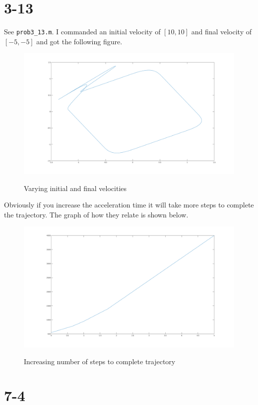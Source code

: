 \documentclass{../homework}
\begin{document}
\begin{parts}[n]
\begin{parts}
       \part{3-13} See \texttt{prob3\_13.m}.  I commanded an initial velocity of $[10, 10]$ and final velocity of $[-5, -5]$ and got the following figure.
       \begin{figure}[H]
            \centering
            \includegraphics[scale=.3]{3_13a.png}
            \label{}
            \caption{Varying initial and final velocities}
       \end{figure}
       Obviously if you increase the acceleration time it will take more steps to complete the trajectory. The graph of how they relate is shown below.
       \begin{figure}[H]
            \centering
            \includegraphics[scale=.3]{3_13b.png}
            \label{}
            \caption{Increasing number of steps to complete trajectory}
       \end{figure}
       \part{7-4}
    \end{parts}

\end{parts}
\end{document}
